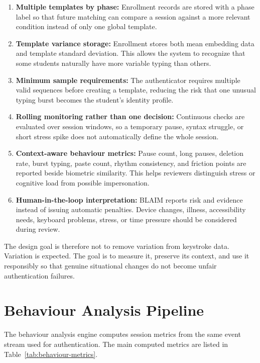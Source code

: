\begin{enumerate}
  \item \textbf{Multiple templates by phase:} Enrollment records are stored with a phase label so that future matching can compare a session against a more relevant condition instead of only one global template.
  \item \textbf{Template variance storage:} Enrollment stores both mean embedding data and template standard deviation. This allows the system to recognize that some students naturally have more variable typing than others.
  \item \textbf{Minimum sample requirements:} The authenticator requires multiple valid sequences before creating a template, reducing the risk that one unusual typing burst becomes the student's identity profile.
  \item \textbf{Rolling monitoring rather than one decision:} Continuous checks are evaluated over session windows, so a temporary pause, syntax struggle, or short stress spike does not automatically define the whole session.
  \item \textbf{Context-aware behaviour metrics:} Pause count, long pauses, deletion rate, burst typing, paste count, rhythm consistency, and friction points are reported beside biometric similarity. This helps reviewers distinguish stress or cognitive load from possible impersonation.
  \item \textbf{Human-in-the-loop interpretation:} BLAIM reports risk and evidence instead of issuing automatic penalties. Device changes, illness, accessibility needs, keyboard problems, stress, or time pressure should be considered during review.
\end{enumerate}

The design goal is therefore not to remove variation from keystroke data. Variation is expected. The goal is to measure it, preserve its context, and use it responsibly so that genuine situational changes do not become unfair authentication failures.

\section{Behaviour Analysis Pipeline}
\label{sec:behaviour-pipeline}

The behaviour analysis engine computes session metrics from the same event stream used for authentication. The main computed metrics are listed in Table~\ref{tab:behaviour-metrics}.

